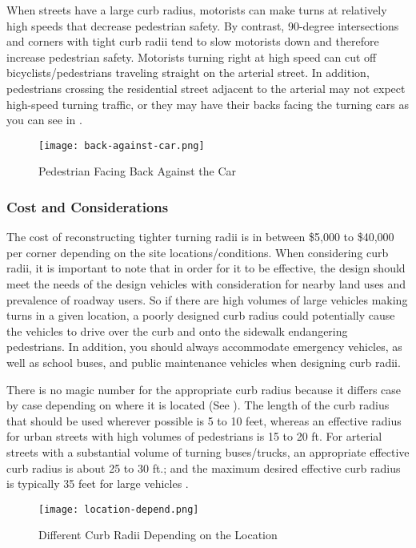         When streets have a large curb radius, motorists can make turns at relatively high speeds that decrease pedestrian safety. By contrast, 90-degree intersections and corners with tight curb radii tend to slow motorists down and therefore increase pedestrian safety. Motorists turning right at high speed can cut off bicyclists/pedestrians traveling straight on the arterial street. In addition, pedestrians crossing the residential street adjacent to the arterial may not expect high-speed turning traffic, or they may have their backs facing the turning cars as you can see in .

\begin{figure}
\centering
	\texttt{[image: back-against-car.png]}
	\caption{Pedestrian Facing Back Against the Car}\label{fig:back-against-car}
\end{figure}

\subsubsection{Cost and Considerations}

The cost of reconstructing tighter turning radii is in between \$5,000 to \$40,000 per corner depending on the site locations/conditions. When considering curb radii, it is important to note that in order for it to be effective, the design should meet the needs of the design vehicles with consideration for nearby land uses and prevalence of roadway users. So if there are high volumes of large vehicles making turns in a given location, a poorly designed curb radius could potentially cause the vehicles to drive over the curb and onto the sidewalk endangering pedestrians. In addition, you should always accommodate emergency vehicles, as well as school buses, and public maintenance vehicles when designing curb radii\cite{walking-info-curb}.


There is no magic number for the appropriate curb radius because it differs case by case depending on where it is located (See ). The length of the curb radius that should be used wherever possible is 5 to 10 feet, whereas an effective radius for urban streets with high volumes of pedestrians is 15 to 20 ft. For arterial streets with a substantial volume of turning buses/trucks, an appropriate effective curb radius is about 25 to 30 ft.; and the maximum desired effective curb radius is typically 35 feet for large vehicles \cite{walking-info-curb}.

\begin{figure}
\centering
	\texttt{[image: location-depend.png]}
	\caption{Different Curb Radii Depending on the Location}\label{fig:location-depend}
\end{figure}